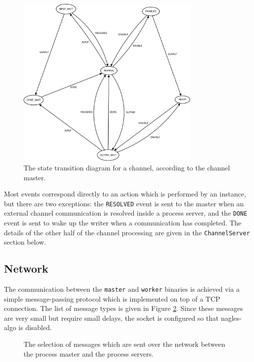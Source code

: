 \begin{figure}[h]
  \centering
  \includegraphics[width=0.8\textwidth]{diagrams/channel_master}
  \caption{
    The state transition diagram for a channel, according to the channel
    master.
  }
  \label{channel-master}
\end{figure}

Most events correspond directly to an action which is performed by an instance,
but there are two exceptions: the \texttt{RESOLVED} event is sent to the master
when an external channel communication is resolved inside a process server, and
the \texttt{DONE} event is sent to wake up the writer when a communication has
completed. The details of the other half of the channel processing are given in
the \texttt{ChannelServer} section below.

\subsection{Network}

The communication between the \texttt{master} and \texttt{worker} binaries is
achieved via a simple message-passing protocol which is implemented on top of
a TCP connection. The list of message types is given in Figure
\ref{message-types}. Since these messages are very small but require small
delays, the socket is configured so that \gls{nagles-algo} is disabled.

\begin{figure}[h]
  
  \caption{
    The selection of messages which are sent over the network between the
    process master and the process servers.
  }
  \label{message-types}
\end{figure}

